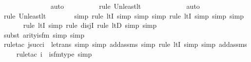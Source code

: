 \begin{isabellebody}
\ \ \ \ \ \ \ \ \ \ \ \ \isamarkupfalse%
\ auto{\isacharbrackleft}{\kern0pt}{}{\isacharbrackright}{\kern0pt}\isanewline
\ \ \ \ \ \ \ \ \ \isamarkupfalse%
{\isacharparenleft}{\kern0pt}rule\ Un{\isacharunderscore}{\kern0pt}least{\isacharunderscore}{\kern0pt}lt{\isacharparenright}{\kern0pt}{\isacharplus}{\kern0pt}\isanewline
\ \ \ \ \ \ \ \ \ \ \ \isamarkupfalse%
\ auto{\isacharbrackleft}{\kern0pt}{}{\isacharbrackright}{\kern0pt}\isanewline
\ \ \ \ \ \isamarkupfalse%
{\isacharparenleft}{\kern0pt}rule\ Un{\isacharunderscore}{\kern0pt}least{\isacharunderscore}{\kern0pt}lt{\isacharparenright}{\kern0pt}{\isacharplus}{\kern0pt}\isanewline
\ \ \ \ \ \ \ \isamarkupfalse%
{\isacharparenleft}{\kern0pt}simp{\isacharcomma}{\kern0pt}\ rule\ ltI{\isacharcomma}{\kern0pt}\ simp{\isacharcomma}{\kern0pt}\ simp{\isacharcomma}{\kern0pt}\ simp{\isacharcomma}{\kern0pt}\ rule\ ltI{\isacharcomma}{\kern0pt}\ simp{\isacharcomma}{\kern0pt}\ simp{\isacharcomma}{\kern0pt}\ simp{\isacharparenright}{\kern0pt}\isanewline
\ \ \ \ \ \isamarkupfalse%
{\isacharparenleft}{\kern0pt}rule\ ltI{\isacharcomma}{\kern0pt}\ simp{\isacharcomma}{\kern0pt}\ rule\ disjI{}{\isacharcomma}{\kern0pt}\ rule\ ltD{\isacharcomma}{\kern0pt}\ simp{\isacharcomma}{\kern0pt}\ simp{\isacharparenright}{\kern0pt}\isanewline
\ \ \ \ \isamarkupfalse%
{\isacharparenleft}{\kern0pt}subst\ arity{\isacharunderscore}{\kern0pt}is{\isacharunderscore}{\kern0pt}{}{\isacharunderscore}{\kern0pt}fm{\isacharcomma}{\kern0pt}\ simp{\isacharcomma}{\kern0pt}\ simp{\isacharparenright}{\kern0pt}\isanewline
\ \ \ \ \isamarkupfalse%
{\isacharparenleft}{\kern0pt}rule{\isacharunderscore}{\kern0pt}tac\ j{\isacharequal}{\kern0pt}{\isachardoublequoteopen}succ{\isacharparenleft}{\kern0pt}i{\isacharparenright}{\kern0pt}{\isachardoublequoteclose}\ \ le{\isacharunderscore}{\kern0pt}trans{\isacharcomma}{\kern0pt}\ simp{\isacharcomma}{\kern0pt}\ simp\ add{\isacharcolon}{\kern0pt}assms{\isacharcomma}{\kern0pt}\ simp{\isacharcomma}{\kern0pt}\ rule\ ltI{\isacharcomma}{\kern0pt}\ simp{\isacharcomma}{\kern0pt}\ simp\ add{\isacharcolon}{\kern0pt}assms{\isacharparenright}{\kern0pt}\isanewline
\ \ \ \isamarkupfalse%
{\isacharparenleft}{\kern0pt}rule{\isacharunderscore}{\kern0pt}tac\ i{\isacharequal}{\kern0pt}{}\ \ is{\isacharunderscore}{\kern0pt}{}{\isacharunderscore}{\kern0pt}fm{\isacharunderscore}{\kern0pt}type{\isacharcomma}{\kern0pt}\ simp{\isacharparenright}{\kern0pt}\isanewline

\end{isabellebody}
